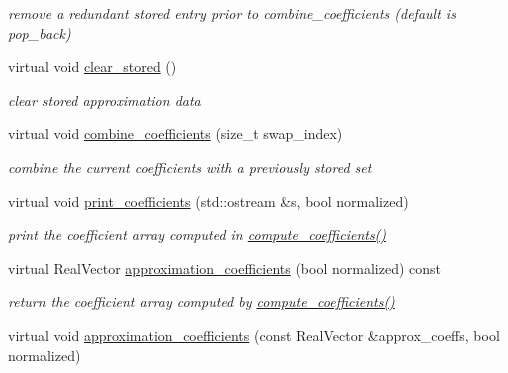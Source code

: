 \begin{DoxyCompactItemize}
\begin{DoxyCompactList}\small\item\em remove a redundant stored entry prior to combine\+\_\+coefficients (default is pop\+\_\+back) \end{DoxyCompactList}\item 
virtual void \hyperlink{classPecos_1_1BasisApproximation_ae4337960917eda26a5672e5c6afbb62a}{clear\+\_\+stored} ()\label{classPecos_1_1BasisApproximation_ae4337960917eda26a5672e5c6afbb62a}

\begin{DoxyCompactList}\small\item\em clear stored approximation data \end{DoxyCompactList}\item 
virtual void \hyperlink{classPecos_1_1BasisApproximation_a7c794213befc83c9f90137f22e4cd39d}{combine\+\_\+coefficients} (size\+\_\+t swap\+\_\+index)\label{classPecos_1_1BasisApproximation_a7c794213befc83c9f90137f22e4cd39d}

\begin{DoxyCompactList}\small\item\em combine the current coefficients with a previously stored set \end{DoxyCompactList}\item 
virtual void \hyperlink{classPecos_1_1BasisApproximation_a4beb4a3300443171ac2233e87c970e39}{print\+\_\+coefficients} (std\+::ostream \&s, bool normalized)\label{classPecos_1_1BasisApproximation_a4beb4a3300443171ac2233e87c970e39}

\begin{DoxyCompactList}\small\item\em print the coefficient array computed in \hyperlink{classPecos_1_1BasisApproximation_aef8f0c32bdeff7756a9c614607c03058}{compute\+\_\+coefficients()} \end{DoxyCompactList}\item 
virtual Real\+Vector \hyperlink{classPecos_1_1BasisApproximation_ac64f16ff9fbfb80c4bafa969b4a92e1d}{approximation\+\_\+coefficients} (bool normalized) const \label{classPecos_1_1BasisApproximation_ac64f16ff9fbfb80c4bafa969b4a92e1d}

\begin{DoxyCompactList}\small\item\em return the coefficient array computed by \hyperlink{classPecos_1_1BasisApproximation_aef8f0c32bdeff7756a9c614607c03058}{compute\+\_\+coefficients()} \end{DoxyCompactList}\item 
virtual void \hyperlink{classPecos_1_1BasisApproximation_a2e7b82322962df3fd036b9e0783d8fc9}{approximation\+\_\+coefficients} (const Real\+Vector \&approx\+\_\+coeffs, bool normalized)\label{classPecos_1_1BasisApproximation_a2e7b82322962df3fd036b9e0783d8fc9}


\end{DoxyCompactItemize}
